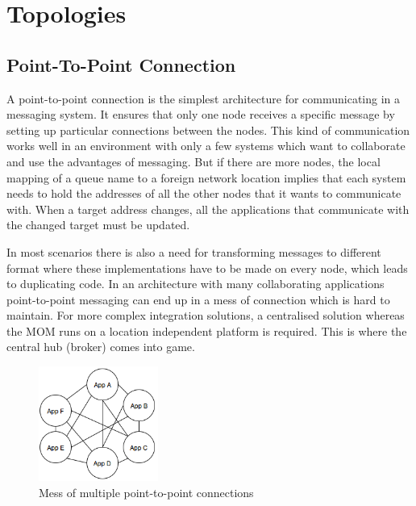 \section{Topologies}
\subsection{Point-To-Point Connection}
\label{intro-messaging-pointtopoint}
A point-to-point connection is the simplest architecture for communicating in a
messaging system. It ensures that only one node receives a specific message by
setting up particular connections between the nodes. This kind of
communication works well in an environment with only a few systems which want to
collaborate and use the advantages of messaging. But if there are more
nodes, the local mapping of a queue name to a foreign network location
implies that each system needs to hold the addresses of all the other nodes that it
wants to communicate with. When a target address changes, all the applications that
communicate with the changed target must be updated. 

In most scenarios there is also a need for transforming messages to different
format where these implementations have to be made on every node, which leads to
duplicating code. In an architecture with many collaborating applications
point-to-point messaging can end up in a mess of connection which is hard to
maintain.  For more complex integration solutions, a centralised solution
whereas the MOM runs on a location independent platform is required. This is
where the central hub (broker) comes into game. \cite{MSDNIntegration}

\begin{figure}[H]
    \centering
    \includegraphics[width=0.35\textwidth]{images/point-to-point-messaging.png}
    \caption{Mess of multiple point-to-point connections}
    \label{fig:point-to-point-messaging}
\end{figure}

